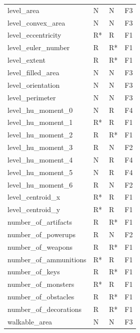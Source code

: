 \begin{longtable}{llll}
		\bottomrule
		\endlastfoot
		level\_area                    &      N &    N &    F3 \\
		level\_convex\_area             &      N &    N &    F3 \\
		level\_eccentricity            &     R* &    R &    F1 \\
		level\_euler\_number            &      R &   R* &    F1 \\
		level\_extent                  &      R &   R* &    F1 \\
		level\_filled\_area             &      N &    N &    F3 \\
		level\_orientation             &      N &    N &    F3 \\
		level\_perimeter               &      N &    N &    F3 \\
		level\_hu\_moment\_0             &      N &    R &    F4 \\
		level\_hu\_moment\_1             &     R* &    R &    F1 \\
		level\_hu\_moment\_2             &      R &   R* &    F1 \\
		level\_hu\_moment\_3             &      R &    N &    F2 \\
		level\_hu\_moment\_4             &      N &    R &    F4 \\
		level\_hu\_moment\_5             &      N &    R &    F4 \\
		level\_hu\_moment\_6             &      R &    N &    F2 \\
		level\_centroid\_x              &     R* &    R &    F1 \\
		level\_centroid\_y              &     R* &    R &    F1 \\
		number\_of\_artifacts           &      R &   R* &    F1 \\
		number\_of\_powerups            &      R &    N &    F2 \\
		number\_of\_weapons             &      R &   R* &    F1 \\
		number\_of\_ammunitions         &     R* &    R &    F1 \\
		number\_of\_keys                &      R &   R* &    F1 \\
		number\_of\_monsters            &     R* &    R &    F1 \\
		number\_of\_obstacles           &      R &   R* &    F1 \\
		number\_of\_decorations         &      R &   R* &    F1 \\
		walkable\_area                 &      N &    N &    F3 \\

\end{longtable}
